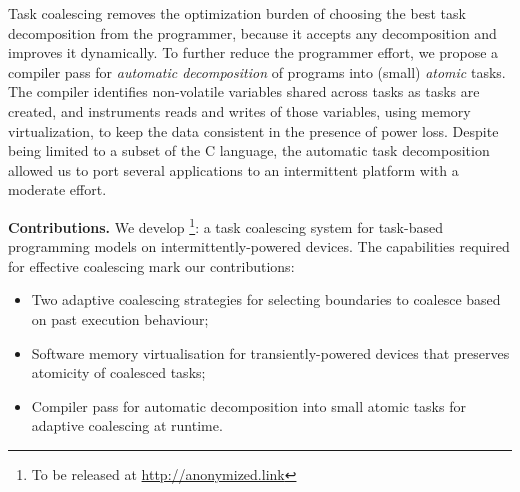 Task coalescing removes the optimization burden of choosing the best task decomposition from the programmer, because it accepts any decomposition and improves it dynamically. To further reduce the programmer effort, we propose a compiler pass for \emph{automatic decomposition} of programs into (small) \emph{atomic} tasks. The compiler identifies non-volatile variables shared across tasks as tasks are created, and instruments reads and writes of those variables, using memory virtualization, to keep the data consistent in the presence of power loss. Despite being limited to a subset of the C language, the automatic task decomposition allowed us to port several
applications to an intermittent platform with a moderate effort.

\textbf{Contributions.} We develop \sys\footnote{To be released at \url{http://anonymized.link}}: a task coalescing system for task-based programming models on intermittently-powered devices. The capabilities required for effective coalescing mark our contributions:

\begin{itemize}
	\item Two adaptive coalescing strategies for selecting boundaries to coalesce based on past execution behaviour;
	\item Software memory virtualisation for transiently-powered devices that preserves atomicity of coalesced tasks;
	\item Compiler pass for automatic decomposition into small atomic tasks for adaptive coalescing at runtime.
\end{itemize}


